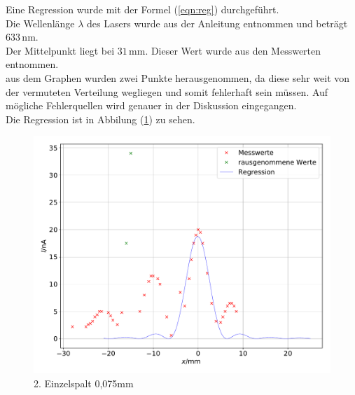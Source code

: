 Eine Regression wurde mit der Formel (\ref{eqn:reg})
durchgeführt.\\
Die Wellenlänge $\lambda$ des Lasers wurde aus der Anleitung entnommen und beträgt $633\, \mathrm{nm}$.\\
Der Mittelpunkt liegt bei $31\, \mathrm{mm}$. Dieser Wert wurde aus den Messwerten entnommen.\\
aus dem Graphen wurden zwei Punkte herausgenommen,
da diese sehr weit von der vermuteten Verteilung wegliegen und somit fehlerhaft sein müssen.
Auf mögliche Fehlerquellen wird genauer in der Diskussion eingegangen.\\
Die Regression ist in Abbilung (\ref{fig:e752}) zu sehen.
\begin{figure}[H]
\centering
\includegraphics[width=\textwidth]{test2.pdf}
\caption{2. Einzelspalt 0,075mm}
\label{fig:e752}
\end{figure}
